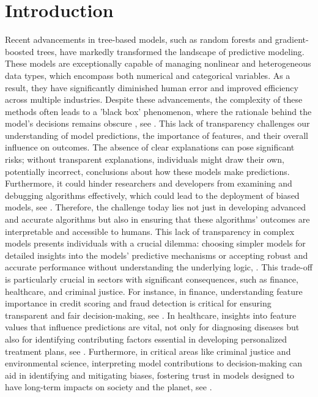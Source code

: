 \documentclass[12pt]{article}
\begin{document}
\section{Introduction}
Recent advancements in tree-based models, such as random forests and gradient-boosted trees, have markedly transformed the landscape of predictive modeling.
These models are exceptionally capable of managing nonlinear and heterogeneous data types, which encompass both numerical and categorical variables. As a result, they have significantly diminished human error and improved efficiency across multiple industries.
Despite these advancements, the complexity of these methods often leads to a 'black box' phenomenon, where the rationale behind the model's decisions remains obscure , see \citep{Rudin2019Why}. 
This lack of transparency challenges our understanding of model predictions, the importance of features, and their overall influence on outcomes. 
The absence of clear explanations can pose significant risks; without transparent explanations, individuals might draw their own, potentially incorrect, conclusions about how these models make predictions.
Furthermore, it could hinder researchers and developers from examining and debugging algorithms effectively, which could lead to the deployment of biased models, see \citep{molnarSHAP}.
Therefore, the challenge today lies not just in developing advanced and accurate algorithms but also in ensuring that these algorithms' outcomes are interpretable and accessible to humans. 
This lack of transparency in complex models presents individuals with a crucial dilemma: choosing simpler models for detailed insights into the models’ predictive mechanisms or accepting robust and accurate performance without understanding the underlying logic, \citep[Section~3.1]{molnar2022}.
This trade-off is particularly crucial in sectors with significant consequences, such as finance, healthcare, and criminal justice. For instance, in finance, understanding feature importance in credit scoring and fraud detection is critical for ensuring transparent and fair decision-making, see \citep{KVAMME2018207}.
In healthcare, insights into feature values that influence predictions are vital, not only for diagnosing diseases but also for identifying contributing factors essential in developing personalized treatment plans, see \citep{Elish2020ASO}.
Furthermore, in critical areas like criminal justice and environmental science, interpreting model contributions to decision-making can aid in identifying and mitigating biases, fostering trust in models designed to have long-term impacts on society and the planet, see \citep{crimedet}.
\end{document}
